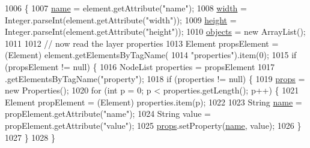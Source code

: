 \begin{DoxyCode}
1006                                                                   \{
1007             \mbox{\hyperlink{classorg_1_1newdawn_1_1slick_1_1tiled_1_1_tiled_map_1_1_object_group_affd673a1cabc99a8c700de0f82e41ba7}{name}} = element.getAttribute(\textcolor{stringliteral}{"name"});
1008             \mbox{\hyperlink{classorg_1_1newdawn_1_1slick_1_1tiled_1_1_tiled_map_1_1_object_group_a5a09777de1d3208dfd45df20aa97b266}{width}} = Integer.parseInt(element.getAttribute(\textcolor{stringliteral}{"width"}));
1009             \mbox{\hyperlink{classorg_1_1newdawn_1_1slick_1_1tiled_1_1_tiled_map_1_1_object_group_a645fa921dd9c7a684e13b513c00072b7}{height}} = Integer.parseInt(element.getAttribute(\textcolor{stringliteral}{"height"}));
1010             \mbox{\hyperlink{classorg_1_1newdawn_1_1slick_1_1tiled_1_1_tiled_map_1_1_object_group_ab11d113b64b9555b7f9e4fb1b2ceccae}{objects}} = \textcolor{keyword}{new} ArrayList();
1011 
1012             \textcolor{comment}{// now read the layer properties}
1013             Element propsElement = (Element) element.getElementsByTagName(
1014                     \textcolor{stringliteral}{"properties"}).item(0);
1015             \textcolor{keywordflow}{if} (propsElement != null) \{
1016                 NodeList properties = propsElement
1017                         .getElementsByTagName(\textcolor{stringliteral}{"property"});
1018                 \textcolor{keywordflow}{if} (properties != null) \{
1019                     \mbox{\hyperlink{classorg_1_1newdawn_1_1slick_1_1tiled_1_1_tiled_map_1_1_object_group_a601905936bbd5be629c436112c3e86cd}{props}} = \textcolor{keyword}{new} Properties();
1020                     \textcolor{keywordflow}{for} (\textcolor{keywordtype}{int} p = 0; p < properties.getLength(); p++) \{
1021                         Element propElement = (Element) properties.item(p);
1022 
1023                         String \mbox{\hyperlink{classorg_1_1newdawn_1_1slick_1_1tiled_1_1_tiled_map_1_1_object_group_affd673a1cabc99a8c700de0f82e41ba7}{name}} = propElement.getAttribute(\textcolor{stringliteral}{"name"});
1024                         String value = propElement.getAttribute(\textcolor{stringliteral}{"value"});
1025                         \mbox{\hyperlink{classorg_1_1newdawn_1_1slick_1_1tiled_1_1_tiled_map_1_1_object_group_a601905936bbd5be629c436112c3e86cd}{props}}.setProperty(\mbox{\hyperlink{classorg_1_1newdawn_1_1slick_1_1tiled_1_1_tiled_map_1_1_object_group_affd673a1cabc99a8c700de0f82e41ba7}{name}}, value);
1026                     \}
1027                 \}
1028             \}

\end{DoxyCode}
